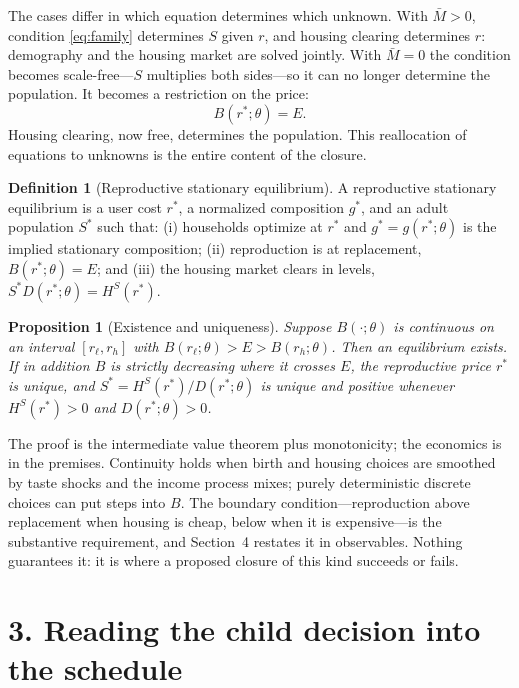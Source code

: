 \documentclass[11pt]{article}
\newtheorem{proposition}{Proposition}
\theoremstyle{definition}
\newtheorem{definition}{Definition}
\begin{document}
The cases differ in which equation determines which unknown. With $\bar M>0$,
condition \eqref{eq:family} determines $S$ given $r$, and housing clearing
determines $r$: demography and the housing market are solved jointly. With
$\bar M=0$ the condition becomes scale-free---$S$ multiplies both sides---so
it can no longer determine the population. It becomes a restriction on the
price:
\begin{equation}
B(r^{*};\theta)=E .
\label{eq:reproduction}
\end{equation}
Housing clearing, now free, determines the population. This reallocation of
equations to unknowns is the entire content of the closure.

\begin{definition}[Reproductive stationary equilibrium]\label{def:rse}
A reproductive stationary equilibrium is a user cost $r^{*}$, a normalized
composition $g^{*}$, and an adult population $S^{*}$ such that:
(i) households optimize at $r^{*}$ and $g^{*}=g(r^{*};\theta)$ is the implied
stationary composition; (ii) reproduction is at replacement,
$B(r^{*};\theta)=E$; and (iii) the housing market clears in levels,
$S^{*}D(r^{*};\theta)=H^S(r^{*})$.
\end{definition}

\begin{proposition}[Existence and uniqueness]\label{prop:exist}
Suppose $B(\cdot;\theta)$ is continuous on an interval $[r_\ell,r_h]$ with
$B(r_\ell;\theta)>E>B(r_h;\theta)$. Then an equilibrium exists. If in addition
$B$ is strictly decreasing where it crosses $E$, the reproductive price
$r^{*}$ is unique, and $S^{*}=H^S(r^{*})/D(r^{*};\theta)$ is unique and
positive whenever $H^S(r^{*})>0$ and $D(r^{*};\theta)>0$.
\end{proposition}

The proof is the intermediate value theorem plus monotonicity; the economics
is in the premises. Continuity holds when birth and housing choices are
smoothed by taste shocks and the income process mixes; purely deterministic
discrete choices can put steps into $B$. The boundary condition---reproduction
above replacement when housing is cheap, below when it is expensive---is the
substantive requirement, and Section~4 restates it in observables. Nothing
guarantees it: it is where a proposed closure of this kind succeeds or fails.

\section*{3. Reading the child decision into the schedule}
\end{document}
